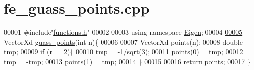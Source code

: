 \hypertarget{fe__guass__points_8cpp_source}{}\section{fe\+\_\+guass\+\_\+points.\+cpp}
\label{fe__guass__points_8cpp_source}

\begin{DoxyCode}
00001 \textcolor{preprocessor}{#include"\hyperlink{functions_8h}{functions.h}"}
00002 
00003 \textcolor{keyword}{using namespace }\hyperlink{namespace_eigen}{Eigen};
00004 
\hyperlink{fe__guass__points_8cpp_aa6ab8c3298fa10734e299fe8266aed35}{00005} VectorXd \hyperlink{fe__guass__points_8cpp_aa6ab8c3298fa10734e299fe8266aed35}{guass\_points}(\textcolor{keywordtype}{int} n)\{
00006 
00007     VectorXd points(n);
00008     \textcolor{keywordtype}{double} tmp;
00009     \textcolor{keywordflow}{if} (n==2)\{
00010         tmp = -1/sqrt(3);
00011         points(0) = tmp;
00012         tmp = -tmp;
00013         points(1) = tmp;
00014     \}
00015 
00016     \textcolor{keywordflow}{return} points;
00017 \}
\end{DoxyCode}
